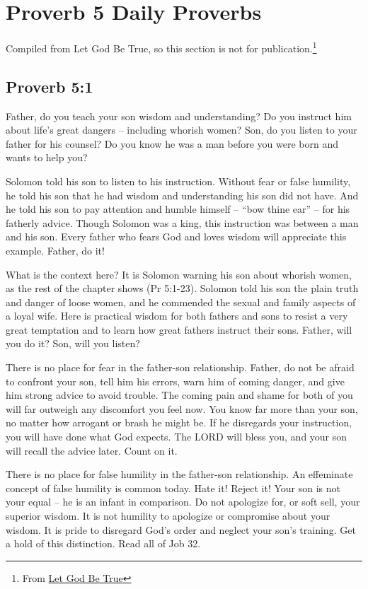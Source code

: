 \section{Proverb 5 Daily Proverbs}
Compiled from Let God Be True, so this section is not for publication.\footnote{From \href{www.LetGodBeTrue.com}{Let God Be True}}

\subsection{Proverb 5:1}
Father, do you teach your son wisdom and understanding? Do you instruct him about life’s great dangers – including whorish women? Son, do you listen to your father for his counsel? Do you know he was a man before you were born and wants to help you?

Solomon told his son to listen to his instruction. Without fear or false humility, he told his son that he had wisdom and understanding his son did not have. And he told his son to pay attention and humble himself – “bow thine ear” – for his fatherly advice. Though Solomon was a king, this instruction was between a man and his son. Every father who fears God and loves wisdom will appreciate this example. Father, do it!

What is the context here? It is Solomon warning his son about whorish women, as the rest of the chapter shows (Pr 5:1-23). Solomon told his son the plain truth and danger of loose women, and he commended the sexual and family aspects of a loyal wife. Here is practical wisdom for both fathers and sons to resist a very great temptation and to learn how great fathers instruct their sons. Father, will you do it? Son, will you listen?

There is no place for fear in the father-son relationship. Father, do not be afraid to confront your son, tell him his errors, warn him of coming danger, and give him strong advice to avoid trouble. The coming pain and shame for both of you will far outweigh any discomfort you feel now. You know far more than your son, no matter how arrogant or brash he might be. If he disregards your instruction, you will have done what God expects. The LORD will bless you, and your son will recall the advice later. Count on it.

There is no place for false humility in the father-son relationship. An effeminate concept of false humility is common today. Hate it! Reject it! Your son is not your equal – he is an infant in comparison. Do not apologize for, or soft sell, your superior wisdom. It is not humility to apologize or compromise about your wisdom. It is pride to disregard God’s order and neglect your son’s training. Get a hold of this distinction. Read all of Job 32.

